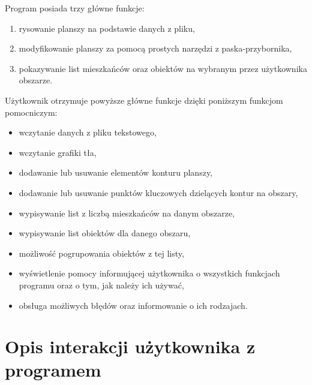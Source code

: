 \documentclass[a4paper,12pt]{article}
\newcommand\tab[1][0.6cm]{\hspace*{#1} }
\begin{document}
\tab Program posiada trzy główne funkcje:
\begin{enumerate}
\item rysowanie planszy na podstawie danych z pliku,
\item modyfikowanie planszy za pomocą prostych narzędzi z paska-przybornika,
\item pokazywanie list mieszkańców oraz obiektów na wybranym przez użytkownika obszarze.
\end{enumerate}
\tab Użytkownik otrzymuje powyższe główne funkcje dzięki poniższym funkcjom pomocniczym:
\begin{itemize}
\item wczytanie danych z pliku tekstowego,
\item wczytanie grafiki tła,
\item dodawanie lub usuwanie elementów konturu planszy,
\item dodawanie lub usuwanie punktów kluczowych dzielących kontur na obszary,
\item wypisywanie list z liczbą mieszkańców na danym obszarze,
\item wypisywanie list obiektów dla danego obszaru,
\item możliwość pogrupowania obiektów z tej listy,
\item wyświetlenie pomocy informującej użytkownika o wszystkich funkcjach programu oraz o tym, jak należy ich używać,
\item obsługa możliwych błędów oraz informowanie o ich rodzajach.
\end{itemize}

\section{Opis interakcji użytkownika z programem}
\end{document}
